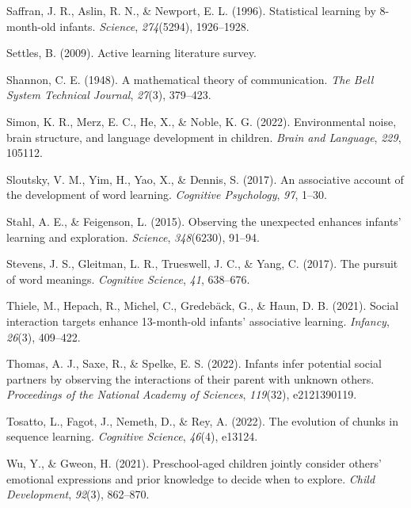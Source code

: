 \documentclass[10pt, letterpaper]{article}
\newenvironment{CSLReferences}%
  {}%
  {\par}
\begin{document}
\begin{CSLReferences}{1}{0}
\leavevmode{}%
Saffran, J. R., Aslin, R. N., \& Newport, E. L. (1996). Statistical
learning by 8-month-old infants. \emph{Science}, \emph{274}(5294),
1926--1928.

\leavevmode{}%
Settles, B. (2009). Active learning literature survey.

\leavevmode{}%
Shannon, C. E. (1948). A mathematical theory of communication. \emph{The
Bell System Technical Journal}, \emph{27}(3), 379--423.

\leavevmode{}%
Simon, K. R., Merz, E. C., He, X., \& Noble, K. G. (2022). Environmental
noise, brain structure, and language development in children.
\emph{Brain and Language}, \emph{229}, 105112.

\leavevmode{}%
Sloutsky, V. M., Yim, H., Yao, X., \& Dennis, S. (2017). An associative
account of the development of word learning. \emph{Cognitive
Psychology}, \emph{97}, 1--30.

\leavevmode{}%
Stahl, A. E., \& Feigenson, L. (2015). Observing the unexpected enhances
infants' learning and exploration. \emph{Science}, \emph{348}(6230),
91--94.

\leavevmode{}%
Stevens, J. S., Gleitman, L. R., Trueswell, J. C., \& Yang, C. (2017).
The pursuit of word meanings. \emph{Cognitive Science}, \emph{41},
638--676.

\leavevmode{}%
Thiele, M., Hepach, R., Michel, C., Gredebäck, G., \& Haun, D. B.
(2021). Social interaction targets enhance 13-month-old infants'
associative learning. \emph{Infancy}, \emph{26}(3), 409--422.

\leavevmode{}%
Thomas, A. J., Saxe, R., \& Spelke, E. S. (2022). Infants infer
potential social partners by observing the interactions of their parent
with unknown others. \emph{Proceedings of the National Academy of
Sciences}, \emph{119}(32), e2121390119.

\leavevmode{}%
Tosatto, L., Fagot, J., Nemeth, D., \& Rey, A. (2022). The evolution of
chunks in sequence learning. \emph{Cognitive Science}, \emph{46}(4),
e13124.

\leavevmode{}%
Wu, Y., \& Gweon, H. (2021). Preschool-aged children jointly consider
others' emotional expressions and prior knowledge to decide when to
explore. \emph{Child Development}, \emph{92}(3), 862--870.

\end{CSLReferences}


\end{document}
